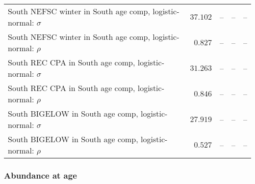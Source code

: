 \documentclass[
]{article}
\begin{document}
\begin{landscape}
\begin{longtable}[t]{lrrrr}
South NEFSC winter in South age comp, logistic-normal: $\sigma$ & $37.102$ & -- & -- & --\\
South NEFSC winter in South age comp, logistic-normal: $\rho$ & $0.827$ & -- & -- & --\\
\addlinespace
South REC CPA in South age comp, logistic-normal: $\sigma$ & $31.263$ & -- & -- & --\\
South REC CPA in South age comp, logistic-normal: $\rho$ & $0.846$ & -- & -- & --\\
South BIGELOW in South age comp, logistic-normal: $\sigma$ & $27.919$ & -- & -- & --\\
South BIGELOW in South age comp, logistic-normal: $\rho$ & $0.527$ & -- & -- & --\\*
\end{longtable}
\end{landscape}

\hypertarget{abundance-at-age}{%
\subsubsection{Abundance at age}\label{abundance-at-age}}
\end{document}
